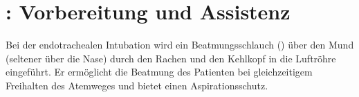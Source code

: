 

\clearpage
\section{: Vorbereitung und
Assistenz} 

\Text
{{\TxBeschreibung}}%
{%
\label{topic:intubation-assistenz}%
Bei der endotrachealen Intubation wird ein
Beatmungsschlauch () über den Mund (seltener über die Nase) durch den
Rachen und den Kehlkopf in die Luftröhre eingeführt. Er
ermöglicht die Beatmung des Patienten bei gleichzeitigem
Freihalten des Atemweges und bietet einen Aspirationsschutz.
}%


